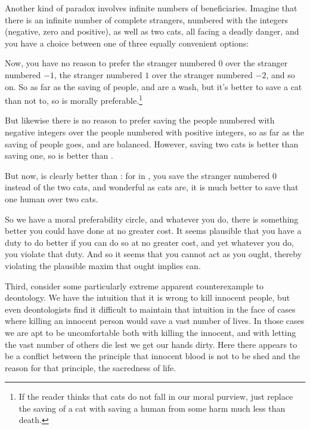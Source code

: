 Another kind of paradox involves infinite numbers of beneficiaries. Imagine that there is an infinite
number of complete strangers, numbered with the integers (negative, zero and positive),
as well as two cats, all facing a deadly danger, and you have a choice between one of three equally convenient options:

Now, you have no reason to prefer
the stranger numbered $0$ over the stranger numbered $-1$, the stranger numbered $1$ over the
stranger numbered $-2$, and so on. So as far as the saving of people,  and 
are a wash, but it's better to save a cat than not to, so  is morally preferable.\footnote{If the
reader thinks that cats do not fall in our moral purview, just replace the saving of a cat with saving a human
from some harm much less than death.}

But likewise there is no reason to prefer saving the people numbered with negative integers over the
people numbered with positive integers, so as far as the saving of people goes,  and
 are balanced. However, saving two cats is better than saving one, so 
is better than . 

But now,  is clearly better than : for in , you save the stranger
numbered $0$ instead of the two cats, and wonderful as cats are, it is much better to save that one human over two cats. 

So we have a moral preferability circle, and whatever you do, there is something better you could have
done at no greater cost. It seems plausible that you have a duty to do better if you can do so at no greater
cost, and yet whatever you do, you violate that duty. And so it seems that you cannot act as you ought,
thereby violating the plausible maxim that ought implies can.

Third, consider some particularly extreme apparent counterexample to deontology. We have the intuition that
it is wrong to kill innocent people, but even deontologists find it difficult to maintain that intuition
in the face of cases where killing an innocent person would save a vast number of lives. In those cases
we are apt to be uncomfortable both with killing the innocent, and with letting the vast number of others
die lest we get our hands dirty. Here there appears to be a conflict between the principle 
that innocent blood is not to be shed and the reason for that principle, the sacredness of life. 

